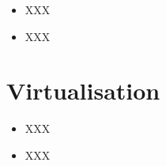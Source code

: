 \begin{itemize}
  \item
    XXX
\end{itemize}

\begin{correction}

\begin{itemize}
  \item
    XXX
\end{itemize}

\end{correction}

%
%

\section{Virtualisation
         }

\begin{itemize}
  \item
    XXX
\end{itemize}

\begin{correction}

\begin{itemize}
  \item
    XXX
\end{itemize}

\end{correction}



